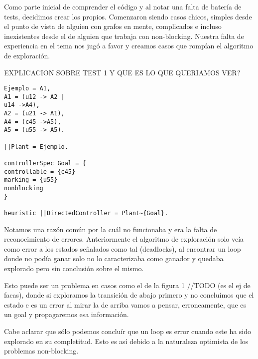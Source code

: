 
Como parte inicial de comprender el código y al notar una falta de batería de tests, decidimos crear los propios. Comenzaron siendo casos chicos, simples desde el punto de vista de alguien con grafos en mente, complicados e incluso inexistentes desde el de alguien que trabaja con non-blocking. Nuestra falta de experiencia en el tema nos jugó a favor y creamos casos que rompían el algoritmo de exploración. 

EXPLICACION SOBRE TEST 1 Y QUE ES LO QUE QUERIAMOS VER?

\begin{lstlisting}[language = mtsa, caption=Test 1]
Ejemplo = A1,
A1 = (u12 -> A2 |
u14 ->A4),
A2 = (u21 -> A1),
A4 = (c45 ->A5),
A5 = (u55 -> A5).

||Plant = Ejemplo.

controllerSpec Goal = {
controllable = {c45}
marking = {u55}
nonblocking
}

heuristic ||DirectedController = Plant~{Goal}.
\end{lstlisting}

Notamos una razón común por la cuál no funcionaba y era la falta de reconocimiento de errores. Anteriormente el algoritmo de exploración solo veía como error a los estados señalados como tal (deadlocks), al encontrar un loop donde no podía ganar solo no lo caracterizaba como ganador y quedaba explorado pero sin conclusión sobre el mismo.

Esto puede ser un problema en casos como el de la figura 1 //TODO (es el ej de facas), donde si exploramos la transición de abajo primero y no concluímos que el estado e es un error al mirar la de arriba vamos a pensar, erroneamente, que es un goal y propagaremos esa información.

Cabe aclarar que sólo podemos concluír que un loop es error cuando este ha sido explorado en su completitud. Esto es así debido a la naturaleza optimista de los problemas non-blocking.